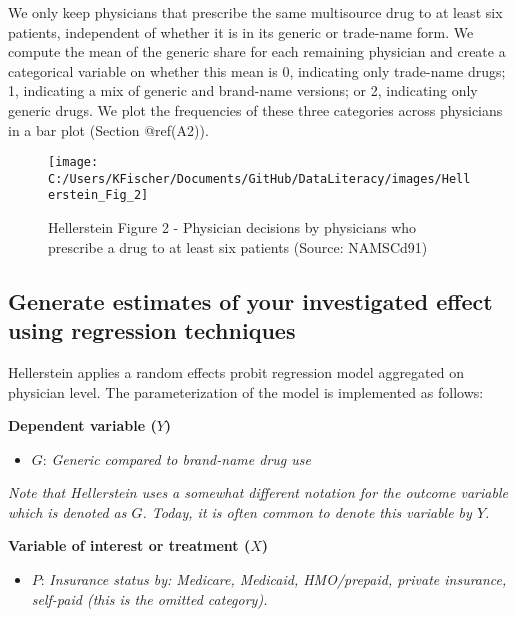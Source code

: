 \documentclass[
]{book}
\providecommand{\tightlist}{%
  \setlength{\itemsep}{0pt}\setlength{\parskip}{0pt}}
\begin{document}
We only keep physicians that prescribe the same multisource drug to at
least six patients, independent of whether it is in its generic or
trade-name form. We compute the mean of the generic share for each
remaining physician and create a categorical variable on whether this
mean is 0, indicating only trade-name drugs; 1, indicating a mix of
generic and brand-name versions; or 2, indicating only generic drugs. We
plot the frequencies of these three categories across physicians in a
bar plot (Section @ref(A2)).

\begin{figure}

{\centering \texttt{[image: C:/Users/KFischer/Documents/GitHub/DataLiteracy/images/Hellerstein\_Fig\_2]} 

}

\caption{Hellerstein Figure 2 - Physician decisions by physicians who prescribe a drug to at least six patients (Source: NAMSCd91)}\label{fig:HellFig2}
\end{figure}

\hypertarget{generate-estimates-of-your-investigated-effect-using-regression-techniques-1}{%
\subsection{Generate estimates of your investigated effect using
regression
techniques}\label{generate-estimates-of-your-investigated-effect-using-regression-techniques-1}}

Hellerstein applies a random effects probit regression model aggregated
on physician level. The parameterization of the model is implemented as
follows:

\textbf{Dependent variable (\(Y\))}

\begin{itemize}
\tightlist
\item
  \(G\): \emph{Generic compared to brand-name drug use}
\end{itemize}

\emph{Note that Hellerstein uses a somewhat different notation for the
outcome variable which is denoted as \(G\). Today, it is often common to
denote this variable by \(Y\).}

\textbf{Variable of interest or treatment (\(X\))}

\begin{itemize}
\tightlist
\item
  \(P\): \emph{Insurance status by: Medicare, Medicaid, HMO/prepaid,
  private insurance, self-paid (this is the omitted category).}
\end{itemize}
\end{document}
